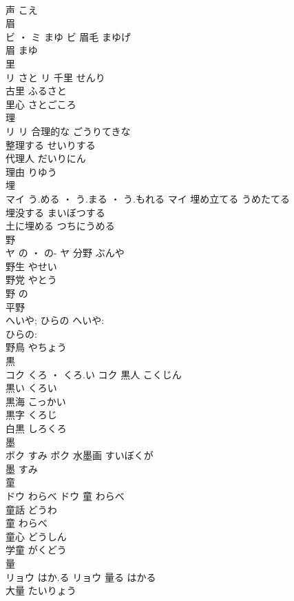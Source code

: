 \documentclass[8pt]{extreport}
\begin{document}
\begin{CJK}{UTF8}{min}
\\	声	こえ	
\\	眉	
\\	ビ ・ ミ	まゆ	ビ	眉毛	まゆげ	
\\	眉	まゆ	
\\	里	
\\	リ	さと	リ	千里	せんり	
\\	古里	ふるさと	
\\	里心	さとごころ	
\\	理	
\\	リ		リ	合理的な	ごうりてきな	
\\	整理する	せいりする	
\\	代理人	だいりにん	
\\	理由	りゆう	
\\	埋	
\\	マイ	う.める ・ う.まる ・ う.もれる	マイ	埋め立てる	うめたてる	
\\	埋没する	まいぼつする	
\\	土に埋める	つちにうめる	
\\	野	
\\	ヤ	の ・ の-	ヤ	分野	ぶんや	
\\	野生	やせい	
\\	野党	やとう	
\\	野	の	
\\	平野 
\\	へいや; ひらの	へいや: 
\\	ひらの: 
\\	野鳥	やちょう	
\\	黒	
\\	コク	くろ ・ くろ.い	コク	黒人	こくじん	
\\	黒い	くろい	
\\	黒海	こっかい	
\\	黒字	くろじ	
\\	白黒	しろくろ	
\\	墨	
\\	ボク	すみ	ボク	水墨画	すいぼくが	
\\	墨	すみ	
\\	童	
\\	ドウ	わらべ	ドウ	童	わらべ	
\\	童話	どうわ	
\\	童	わらべ	
\\	童心	どうしん	
\\	学童	がくどう	
\\	量	
\\	リョウ	はか.る	リョウ	量る	はかる	
\\	大量	たいりょう	

\end{CJK}
\end{document}
